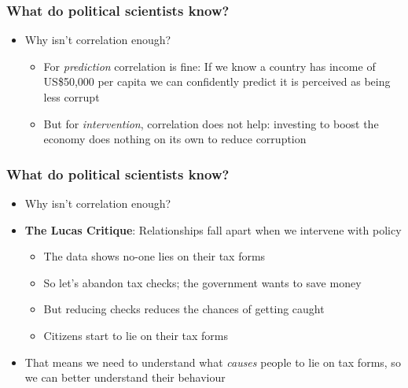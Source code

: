\documentclass[xcolor=x11names,compress]{beamer}\usepackage[]{graphicx}\usepackage[]{color}
\renewcommand{\(}{\begin{columns}}
\renewcommand{\)}{\end{columns}}
\newcommand{\<}[1]{\begin{column}{#1}}
\renewcommand{\>}{\end{column}}
\begin{document}








\begin{frame}
\frametitle{What do political scientists \textbf{know}?}
\begin{itemize}
\item Why isn't correlation enough?
\begin{itemize}
\item For \textit{prediction} correlation is fine: If we know a country has income of US\$50,000 per capita we can confidently predict it is perceived as being less corrupt
\item But for \textit{intervention}, correlation does not help: investing to boost the economy does nothing on its own to reduce corruption
\end{itemize}
\end{itemize}
\end{frame}

\begin{frame}
\frametitle{What do political scientists \textbf{know}?}
\begin{itemize}
\item Why isn't correlation enough?
\item \textbf{The Lucas Critique}: Relationships fall apart when we intervene with policy
\begin{itemize}
\item The data shows no-one lies on their tax forms
\item So let's abandon tax checks; the government wants to save money
\item But reducing checks reduces the chances of getting caught
\item Citizens start to lie on their tax forms
\end{itemize}
\item That means we need to understand what \textit{causes} people to lie on tax forms, so we can better understand their behaviour
\end{itemize}
\end{frame}
\end{document}
